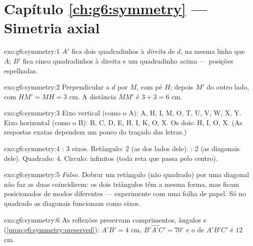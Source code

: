 \section*{Capítulo \ref{ch:g6:symmetry} --- Simetria axial}

\begin{solution}{exo:g6:symmetry:1}
$A'$ fica dois quadradinhos à \emph{direita} de $d$, na mesma linha que
$A$; $B'$ fica cinco quadradinhos à direita e um quadradinho acima ---
posições espelhadas.
\end{solution}

\begin{solution}{exo:g6:symmetry:2}
Perpendicular a $d$ por $M$, com pé $H$; depois $M'$ do outro lado, com
$HM' = MH = 3$ cm. A distância $MM'$ é $3 + 3 = 6$ cm.
\end{solution}

\begin{solution}{exo:g6:symmetry:3}
Eixo vertical (como o A): A, H, I, M, O, T, U, V, W, X, Y.
Eixo horizontal (como o B): B, C, D, E, H, I, K, O, X.
Os dois: H, I, O, X.
(As respostas exatas dependem um pouco do traçado das letras.)
\end{solution}

\begin{solution}{exo:g6:symmetry:4}
: $3$ eixos. Retângulo: $2$ (as  dos
lados dele). : $2$ (as diagonais dele). Quadrado: $4$. Círculo:
infinitos (toda reta que passa pelo centro).
\end{solution}

\begin{solution}{exo:g6:symmetry:5}
\emph{Falso.} Dobrar um retângulo (não quadrado) por uma diagonal não
faz as duas  coincidirem: os dois triângulos têm a mesma forma,
mas ficam posicionados de modos diferentes --- experimente com uma
folha de papel. Só no quadrado as diagonais funcionam como eixos.
\end{solution}

\begin{solution}{exo:g6:symmetry:6}
As reflexões preservam comprimentos, ângulos e 
(\cref{prop:g6:symmetry:preserved}): $A'B' = 4$ cm,
$\widehat{B'A'C'} = 70^\circ$ e o  de $A'B'C'$ é $12$ cm.
\end{solution}

